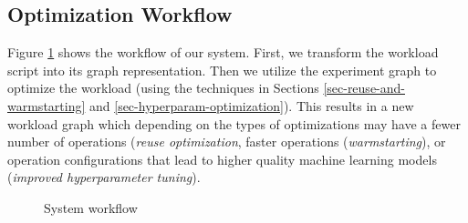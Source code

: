 \subsection{Optimization Workflow}
Figure \ref{fig-system-workflow} shows the workflow of our system.
First, we transform the workload script into its graph representation.
Then we utilize the experiment graph to optimize the workload (using the techniques in Sections \ref{sec-reuse-and-warmstarting} and \ref{sec-hyperparam-optimization}).
This results in a new workload graph which depending on the types of optimizations may have a fewer number of operations (\textit{reuse optimization}, faster operations (\textit{warmstarting}), or operation configurations that lead to higher quality machine learning models (\textit{improved hyperparameter tuning}).
\begin{figure}
\centering

\caption{System workflow}
\label{fig-system-workflow}
\end{figure}

